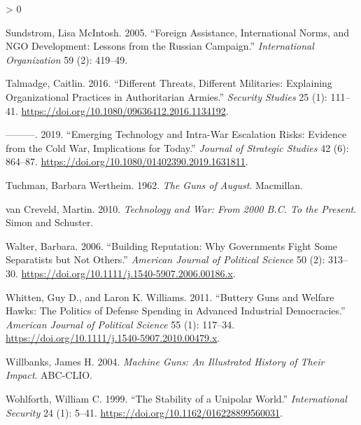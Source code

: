 \documentclass[
]{article}
\newlength{\cslhangindent}
\newenvironment{CSLReferences}[2] %
 {%
  \setlength{\parindent}{0pt}
  \ifodd #1 \everypar{\setlength{\hangindent}{\cslhangindent}}\ignorespaces\fi
  \ifnum #2 > 0
  \setlength{\parskip}{#2\baselineskip}
  \fi
 }%
 {}
\begin{document}
\begin{CSLReferences}{1}{0}
\leavevmode\hypertarget{ref-sundstrom_foreignassistanceinternational_2005}{}%
Sundstrom, Lisa McIntosh. 2005. {``Foreign {Assistance}, {International Norms}, and {NGO Development}: {Lessons} from the {Russian Campaign}.''} \emph{International Organization} 59 (2): 419--49.

\leavevmode\hypertarget{ref-talmadge_differentthreatsdifferent_2016}{}%
Talmadge, Caitlin. 2016. {``Different {Threats}, {Different Militaries}: {Explaining Organizational Practices} in {Authoritarian Armies}.''} \emph{Security Studies} 25 (1): 111--41. \url{https://doi.org/10.1080/09636412.2016.1134192}.

\leavevmode\hypertarget{ref-talmadge_emergingtechnologyintrawar_2019}{}%
---------. 2019. {``Emerging Technology and Intra-War Escalation Risks: {Evidence} from the {Cold War}, Implications for Today.''} \emph{Journal of Strategic Studies} 42 (6): 864--87. \url{https://doi.org/10.1080/01402390.2019.1631811}.

\leavevmode\hypertarget{ref-tuchman_gunsaugust_1962}{}%
Tuchman, Barbara Wertheim. 1962. \emph{The {Guns} of {August}}. {Macmillan}.

\leavevmode\hypertarget{ref-vancreveld_technologywar2000_2010}{}%
van Creveld, Martin. 2010. \emph{Technology and {War}: {From} 2000 {B}.{C}. To the {Present}}. {Simon and Schuster}.

\leavevmode\hypertarget{ref-walter_buildingreputationwhy_2006}{}%
Walter, Barbara. 2006. {``Building {Reputation}: {Why Governments Fight Some Separatists} but {Not Others}.''} \emph{American Journal of Political Science} 50 (2): 313--30. \url{https://doi.org/10.1111/j.1540-5907.2006.00186.x}.

\leavevmode\hypertarget{ref-whitten_butterygunswelfare_2011}{}%
Whitten, Guy D., and Laron K. Williams. 2011. {``Buttery {Guns} and {Welfare Hawks}: {The Politics} of {Defense Spending} in {Advanced Industrial Democracies}.''} \emph{American Journal of Political Science} 55 (1): 117--34. \url{https://doi.org/10.1111/j.1540-5907.2010.00479.x}.

\leavevmode\hypertarget{ref-willbanks_machinegunsillustrated_2004}{}%
Willbanks, James H. 2004. \emph{Machine {Guns}: {An Illustrated History} of {Their Impact}}. {ABC-CLIO}.

\leavevmode\hypertarget{ref-wohlforth_stabilityunipolarworld_1999}{}%
Wohlforth, William C. 1999. {``The {Stability} of a {Unipolar World}.''} \emph{International Security} 24 (1): 5--41. \url{https://doi.org/10.1162/016228899560031}.

\end{CSLReferences}
\end{document}
